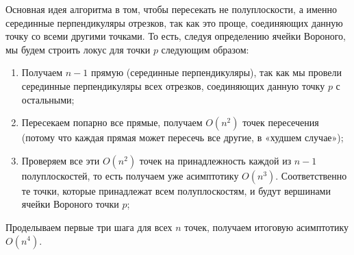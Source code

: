 Основная идея алгоритма в том, чтобы пересекать не полуплоскости, а именно серединные перпендикуляры отрезков, так как это проще, соединяющих данную точку со всеми другими точками. То есть, следуя определению ячейки Вороного, мы будем строить локус для точки $p$ следующим образом:

\begin{enumerate}
	\item Получаем $n-1$ прямую (серединные перпендикуляры), так как мы провели серединные перпендикуляры всех отрезков, соединяющих данную точку $p$ с остальными;
	\item Пересекаем попарно все прямые, получаем $O(n^2)$ точек пересечения (потому что каждая прямая может пересечь все другие, в «худшем случае»);
	\item Проверяем все эти $O(n^2)$ точек на принадлежность каждой из $n-1$ полуплоскостей, то есть получаем уже асимптотику $O(n^3)$. Соответственно те точки, которые принадлежат всем полуплоскостям, и будут вершинами ячейки Вороного точки $p$;
\end{enumerate}

Проделываем первые три шага для всех $n$ точек, получаем итоговую асимптотику $O(n^4)$.
